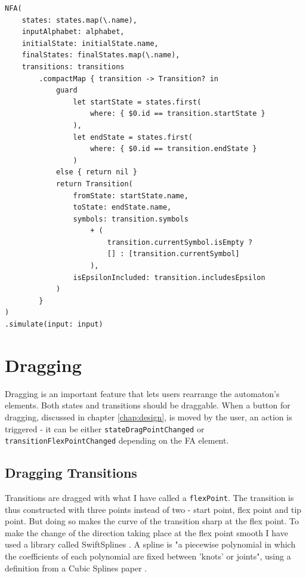 \begin{lstlisting}[caption={\lstinline{NFA} initialization in \lstinline{AutomataLibrarryService}}, label=nfa-init]
NFA(
    states: states.map(\.name),
    inputAlphabet: alphabet,
    initialState: initialState.name,
    finalStates: finalStates.map(\.name),
    transitions: transitions
        .compactMap { transition -> Transition? in
            guard
                let startState = states.first(
                    where: { $0.id == transition.startState }
                ),
                let endState = states.first(
                    where: { $0.id == transition.endState }
                )
            else { return nil }
            return Transition(
                fromState: startState.name,
                toState: endState.name,
                symbols: transition.symbols
                    + (
                        transition.currentSymbol.isEmpty ? 
                        [] : [transition.currentSymbol]
                    ),
                isEpsilonIncluded: transition.includesEpsilon
            )
        }
)
.simulate(input: input)
\end{lstlisting}

\section{Dragging}

Dragging is an important feature that lets users rearrange the automaton's elements. Both states and transitions should be draggable. When a button for dragging, discussed in chapter \ref{chap:design}, is moved by the user, an action is triggered - it can be either \lstinline{stateDragPointChanged} or \lstinline{transitionFlexPointChanged} depending on the FA element.

\subsection{Dragging Transitions}

Transitions are dragged with what I have called a \lstinline{flexPoint}. The transition is thus constructed with three points instead of two - start point, flex point and tip point. But doing so makes the curve of the transition sharp at the flex point. To make the change of the direction taking place at the flex point smooth I have used a library called SwiftSplines \cite{swiftsplines}. A spline is "a piecewise polynomial in which the coefficients of each polynomial are fixed between 'knots' or joints", using a definition from a Cubic Splines paper \cite{cubic-splines}.

